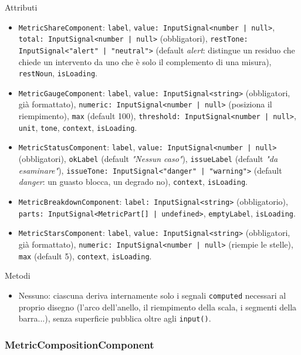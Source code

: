 \documentclass[a4paper,12pt]{article}
\begin{document}
\begin{sloppypar}
Attributi
\begin{itemize}\raggedright
    \item \texttt{MetricShareComponent}: \texttt{label}, \texttt{value: InputSignal<number | null>}, \texttt{total: InputSignal<number | null>} (obbligatori), \texttt{restTone: InputSignal<"alert" | "neutral">} (default \textit{alert}: distingue un residuo che chiede un intervento da uno che è solo il complemento di una misura), \texttt{restNoun}, \texttt{isLoading}.
    \item \texttt{MetricGaugeComponent}: \texttt{label}, \texttt{value: InputSignal<string>} (obbligatori, già formattato), \texttt{numeric: InputSignal<number | null>} (posiziona il riempimento), \texttt{max} (default 100), \texttt{threshold: InputSignal<number | null>}, \texttt{unit}, \texttt{tone}, \texttt{context}, \texttt{isLoading}.
    \item \texttt{MetricStatusComponent}: \texttt{label}, \texttt{value: InputSignal<number | null>} (obbligatori), \texttt{okLabel} (default \textit{"Nessun caso"}), \texttt{issueLabel} (default \textit{"da esaminare"}), \texttt{issueTone: InputSignal<"danger" | "warning">} (default \textit{danger}: un guasto blocca, un degrado no), \texttt{context}, \texttt{isLoading}.
    \item \texttt{MetricBreakdownComponent}: \texttt{label: InputSignal<string>} (obbligatorio), \texttt{parts: InputSignal<MetricPart[] | undefined>}, \texttt{emptyLabel}, \texttt{isLoading}.
    \item \texttt{MetricStarsComponent}: \texttt{label}, \texttt{value: InputSignal<string>} (obbligatori, già formattato), \texttt{numeric: InputSignal<number | null>} (riempie le stelle), \texttt{max} (default 5), \texttt{context}, \texttt{isLoading}.
\end{itemize}

Metodi
\begin{itemize}\raggedright
    \item Nessuno: ciascuna deriva internamente solo i segnali \texttt{computed} necessari al proprio disegno (l'arco dell'anello, il riempimento della scala, i segmenti della barra...), senza superficie pubblica oltre agli \texttt{input()}.
\end{itemize}

\subsubsection{MetricCompositionComponent}


\end{sloppypar}
\end{document}
